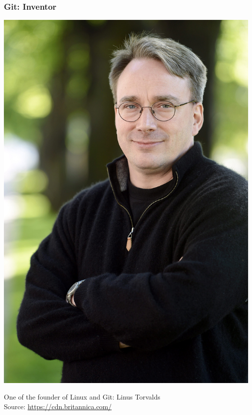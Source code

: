 \documentclass{beamer} %
\begin{document}
\begin{frame}[t]
\frametitle{Git: Inventor}
\begin{center}
	
	\includegraphics[scale=0.10]{assets/Linus-Torvalds-2012.jpg}
	
	One of the founder of Linux and Git: Linus Torvalds\\
	Source: \url{https://cdn.britannica.com/}
	
\end{center}
\end{frame}
\end{document}
